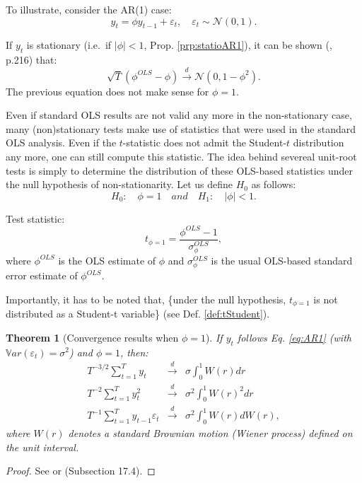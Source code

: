 \documentclass[
  12pt,
]{book}
\newtheorem{theorem}{Theorem}[chapter]
\theoremstyle{definition}
\theoremstyle{definition}
\theoremstyle{definition}
\theoremstyle{definition}
\theoremstyle{remark}
\begin{document}
To illustrate, consider the AR(1) case:
\begin{equation}
y_t = \phi y_{t-1} + \varepsilon_t, \quad \varepsilon_t \sim \mathcal{N}(0,1).\label{eq:AR1}
\end{equation}

If \(y_t\) is stationary (i.e.~if \(|\phi|<1\), Prop. \ref{prp:statioAR1}), it can be shown (\citet{Hamilton_1994}, p.216) that:
\[
\sqrt{T}(\phi^{OLS}-\phi) \overset{d}{\rightarrow}  \mathcal{N}(0,1-\phi^2).
\]
The previous equation does not make sense for \(\phi=1\).

Even if standard OLS results are not valid any more in the non-stationary case, many (non)stationary tests make use of statistics that were used in the standard OLS analysis. Even if the \(t\)-statistic does not admit the Student-\(t\) distribution any more, one can still compute this statistic. The idea behind severeal unit-root tests is simply to determine the distribution of these OLS-based statistics under the null hypothesis of non-stationarity. Let us define \(H_0\) as follows:
\[
H_0:\quad \phi = 1 \quad and \quad H_1: \quad |\phi| < 1.
\]

Test statistic:
\[
t_{\phi=1} = \frac{\phi^{OLS}-1}{\sigma^{OLS}_{\phi}},
\]
where \(\phi^{OLS}\) is the OLS estimate of \(\phi\) and \(\sigma^{OLS}_{\phi}\) is the usual OLS-based standard error estimate of \(\phi^{OLS}\).

Importantly, it has to be noted that, \{\color{blue}under the null hypothesis, \(t_{\phi=1}\) is not distributed as a Student-t variable\} (see Def. \ref{def:tStudent}).

\begin{theorem}[Convergence results when $\phi=1$]
\protect\hypertarget{thm:cvgceunitroot}{}\label{thm:cvgceunitroot}If \(y_t\) follows Eq. \eqref{eq:AR1} (with \(\mathbb{V}ar(\varepsilon_t)=\sigma^2\)) and \(\phi=1\), then:
\begin{eqnarray}
T^{-3/2} \sum_{t=1}^{T} y_{t} &\overset{d}{\rightarrow}& \sigma \int_{0}^{1}W(r)dr\\
T^{-2} \sum_{t=1}^{T} y_{t}^2 &\overset{d}{\rightarrow}& \sigma^2 \int_{0}^{1}W(r)^2dr\\
T^{-1} \sum_{t=1}^{T} y_{t-1}\varepsilon_{t} &\overset{d}{\rightarrow}& \sigma^2 \int_{0}^{1}W(r)dW(r),
\end{eqnarray}
where \(W(r)\) denotes a standard Brownian motion (Wiener process) defined on the unit interval.
\end{theorem}

\begin{proof}
See \citet{Phillips_1987} or \citet{Hamilton_1994} (Subsection 17.4).
\end{proof}
\end{document}

